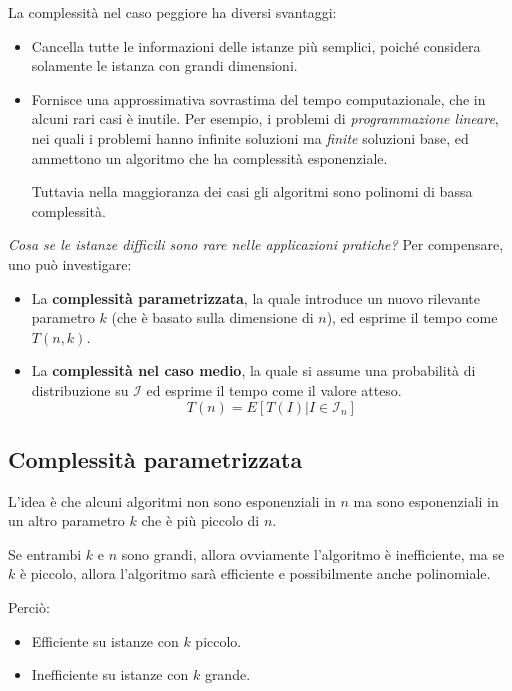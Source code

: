 \documentclass{article}
\begin{document}
La complessità nel caso peggiore ha diversi svantaggi:
\begin{itemize}
    \item Cancella tutte le informazioni delle istanze più semplici, poiché considera
          solamente le istanza con grandi dimensioni.

    \item Fornisce una approssimativa sovrastima del tempo computazionale, che
          in alcuni rari casi è inutile. Per esempio, i problemi di \textit{programmazione
              lineare}, nei quali i problemi hanno infinite soluzioni ma \textit{finite} soluzioni
          base, ed ammettono un algoritmo che ha complessità esponenziale.

          Tuttavia nella maggioranza dei casi gli algoritmi sono polinomi di bassa complessità.
\end{itemize}
\noindent\textit{Cosa se le istanze difficili sono rare nelle applicazioni pratiche?}
Per compensare, uno può investigare:
\begin{itemize}
    \item La \textbf{complessità parametrizzata}, la quale introduce un nuovo rilevante
          parametro $k$ (che è basato sulla dimensione di $n$), ed esprime il tempo come $T(n,k)$.
    \item La \textbf{complessità nel caso medio}, la quale si assume una probabilità di
          distribuzione su $\mathcal{I}$ ed esprime il tempo come il valore atteso.
          $$T(n)=E[T(I)|I\in \mathcal{I}_n]$$

\end{itemize}

\subsection{Complessità parametrizzata}
L'idea è che alcuni algoritmi non sono esponenziali in $n$ ma sono esponenziali in un
altro parametro $k$ che è più piccolo di $n$.

Se entrambi $k$ e $n$ sono grandi, allora ovviamente l'algoritmo è inefficiente, ma se $k$
è piccolo, allora l'algoritmo sarà efficiente e possibilmente anche polinomiale.

Perciò:
\begin{itemize}
    \item Efficiente su istanze con $k$ piccolo.
    \item Inefficiente su istanze con $k$ grande.
\end{itemize}
\end{document}
